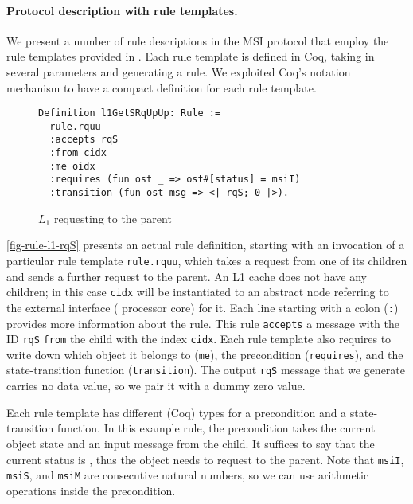 \documentclass[sigplan,10pt,review,anonymous,screen]{acmart}\settopmatter{printfolios=true,printccs=false,printacmref=false}
\def\slstinline{\lstinline[basicstyle=\ttfamily\small]}
\begin{document}
\paragraph{Protocol description with rule templates.}


We present a number of rule descriptions in the MSI protocol that employ the rule templates provided in \hemiola{}.
Each rule template is defined in Coq, taking in several parameters and generating a rule.
We exploited Coq's notation mechanism to have a compact definition for each rule template.

\begin{figure}[h]
  \centering
\begin{lstlisting}
Definition l1GetSRqUpUp: Rule :=
  rule.rquu
  :accepts rqS
  :from cidx
  :me oidx
  :requires (fun ost _ => ost#[status] = msiI)
  :transition (fun ost msg => <| rqS; 0 |>).
\end{lstlisting}
  \caption{$L_1$ requesting \stS{} to the parent}
  \label{fig-rule-l1-rqS}
\end{figure}

\autoref{fig-rule-l1-rqS} presents an actual rule definition, starting with an invocation of a particular rule template \slstinline{rule.rquu}, which takes a request from one of its children and sends a further request to the parent.
An L1 cache does not have any children; in this case \slstinline{cidx} will be instantiated to an abstract node referring to the external interface (\ie{} processor core) for it.
Each line starting with a colon (\slstinline{:}) provides more information about the rule.
This rule \slstinline{accepts} a message with the ID \slstinline{rqS} \slstinline{from} the child with the index \slstinline{cidx}.
Each rule template also requires to write down which object it belongs to (\slstinline{me}), the precondition (\slstinline{requires}), and the state-transition function (\slstinline{transition}).
The output \slstinline{rqS} message that we generate carries no data value, so we pair it with a dummy zero value.

Each rule template has different (Coq) types for a precondition and a state-transition function.
In this example rule, the precondition takes the current object state and an input message from the child.
It suffices to say that the current status is \stI{}, thus the object needs to request to the parent.
Note that \slstinline{msiI}, \slstinline{msiS}, and \slstinline{msiM} are consecutive natural numbers, so we can use arithmetic operations inside the precondition.
\end{document}
